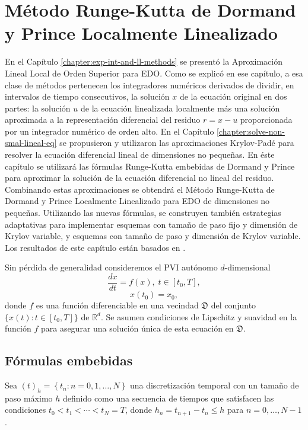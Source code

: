 \chapter{Método Runge-Kutta de Dormand y Prince Localmente Linealizado}\label{chapter:lldp}

En el Capítulo \ref{chapter:exp-int-and-ll-methods} se presentó la Aproximación Lineal Local de Orden Superior para EDO. Como se explicó en ese capítulo, a esa clase de métodos pertenecen los integradores numéricos derivados de dividir, en intervalos de tiempo consecutivos, la solución $x$ de la ecuación original en dos partes: la solución $u$ de la ecuación linealizada localmente más una solución aproximada a la representación diferencial del residuo $r=x-u$ proporcionada por un integrador numérico de orden alto. En el Capítulo \ref{chapter:solve-non-smal-lineal-eq} se propusieron y utilizaron las aproximaciones Krylov-Padé para resolver la ecuación diferencial lineal de dimensiones no pequeñas. En éste capítulo se utilizará las fórmulas  Runge-Kutta embebidas de Dormand y Prince para aproximar la solución de la ecuación diferencial no lineal del residuo. Combinando estas aproximaciones se obtendrá el Método Runge-Kutta de Dormand y Prince Localmente Linealizado para EDO de dimensiones no pequeñas. Utilizando las nuevas fórmulas, se construyen también estrategias adaptativas para implementar esquemas con tamaño de paso fijo y dimensión de Krylov variable, y esquemas con tamaño de paso y dimensión de Krylov variable. Los resultados de este capítulo están basados en \cite{naranjo2021locally}.

Sin pérdida de generalidad consideremos el PVI autónomo $d$-dimensional
\begin{equation}\label{syst}
\frac{dx}{dt}=f(x), \; t\in[t_0,T],\end{equation}
\begin{equation}\label{systcond}
x(t_0)=x_0,
\end{equation}donde $f$ es una función diferenciable en una vecindad
$\mathfrak{D}$ del conjunto $\{x(t):t\in [t_0,T]\}$ de $\mathbb{R}^{d}$. Se asumen condiciones de Lipschitz y suavidad en la función $f$ para asegurar una solución única de esta ecuación en $\mathfrak{D}$.

\section{Fórmulas embebidas}

Sea $\left( t\right) _{h}=\left\{ t_{n}:n=0,1,\ldots ,N\right\}$ una discretización temporal con un tamaño de paso máximo $h$ definido como una secuencia de tiempos que satisfacen las condiciones $t_{0}<t_{1}<\cdots <t_{N}=T$, donde $h_{n}=t_{n+1}-t_{n}\leq h$ para $n=0,\ldots,N-1$.

